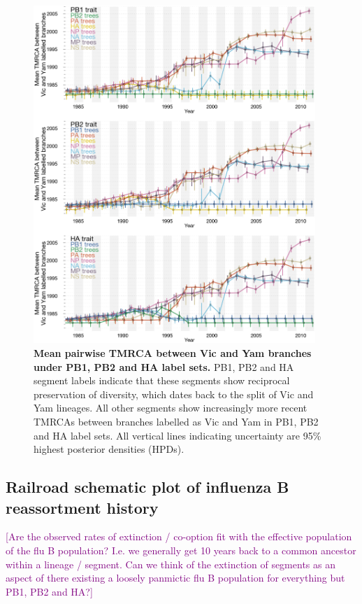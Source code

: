 \documentclass[11pt,oneside,letterpaper]{article}
\def\tbc#1{\textcolor{purple}{[#1]}}
\begin{document}
\begin{figure}
	\centering		
	\includegraphics[width=0.95\textwidth]{figures/InfB_betweenDiversity.png}
	\caption{\textbf{Mean pairwise TMRCA between Vic and Yam branches under PB1, PB2 and HA label sets.}
PB1, PB2 and HA segment labels indicate that these segments show reciprocal preservation of diversity, which dates back to the split of Vic and Yam lineages.
All other segments show increasingly more recent TMRCAs between branches labelled as Vic and Yam in PB1, PB2 and HA label sets.
All vertical lines indicating uncertainty are 95\% highest posterior densities (HPDs).}
	\label{betweenDiversity}
\end{figure}

\subsection*{Railroad schematic plot of influenza B reassortment history}

\tbc{Are the observed rates of extinction / co-option fit with the effective population of the flu B population?  I.e. we generally get 10 years back to a common ancestor within a lineage / segment.  Can we think of the extinction of segments as an aspect of there existing a loosely panmictic flu B population for everything but PB1, PB2 and HA?}
\end{document}
